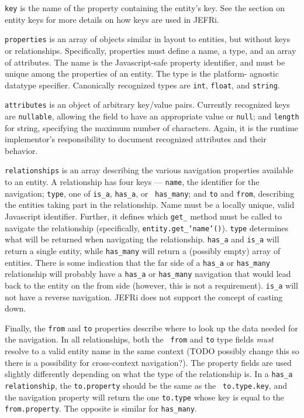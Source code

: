 \documentclass{article}
\newcommand{\ilcode}{\tt}
\begin{document}
{\ilcode key} is the name of the property containing the entity's key. See the
section on entity keys for more details on how keys are used in JEFRi.

{\ilcode properties} is an array of objects similar in layout to entities, but without
keys or relationships. Specifically, properties must define a name, a type, and
an array of attributes. The name is the Javascript-safe property identifier, and
must be unique among the properties of an entity. The type is the platform-
agnostic datatype specifier. Canonically recognized types are {\ilcode int},
{\ilcode float}, and {\ilcode string}.

{\ilcode attributes} is an object of arbitrary key/value pairs. Currently
recognized keys are {\ilcode nullable}, allowing the field to have an appropriate
value or {\ilcode null}; and {\ilcode length} for string, specifying the maximum number of
characters. Again, it is the runtime implementor's responsibility to document
recognized attributes and their behavior.

{\ilcode relationships} is an array describing the various navigation properties available
to an entity. A relationship has four keys --- {\ilcode name}, the identifier for the
navigation; {\ilcode type}, one of {\ilcode is\_a}, {\ilcode has\_a}, or {\ilcode
has\_many}; and {\ilcode to} and {\ilcode from}, describing the entities taking part in the
relationship. Name must be a locally unique, valid Javascript identifier.
Further, it defines which {\ilcode get\_} method must be called to navigate the
relationship (specifically, {\ilcode entity.get\_`name'()}). {\ilcode type} determines
what will be returned when navigating the relationship. {\ilcode has\_a} and
{\ilcode is\_a} will return a single entity, while {\ilcode has\_many} will
return a (possibly empty) array of entities. There is some indication that
the far side of a {\ilcode has\_a} or {\ilcode has\_many} relationship will
probably have a {\ilcode has\_a} or {\ilcode has\_many} navigation that would
lead back to the entity on the from side (however, this is not a requirement).
{\ilcode is\_a} will not have a reverse navigation. JEFRi does not support the
concept of casting down.

Finally, the {\ilcode from} and {\ilcode to} properties describe where to look
up the data needed for the navigation. In all relationships, both the {\ilcode
from} and {\ilcode to} type fields {\it must} resolve to a valid entity name in
the same context (TODO possibly change this so there is a possibility for
cross-context navigation?). The property fields are used slightly differently
depending on what the type of the relationship is. In a {\ilcode has\_a
relationship}, the {\ilcode to.property} should be the same as the {\ilcode
to.type.key}, and the navigation property will return the one {\ilcode to.type}
whose key is equal to the {\ilcode from.property}. The opposite is similar for
{\ilcode has\_many}.
\end{document}
